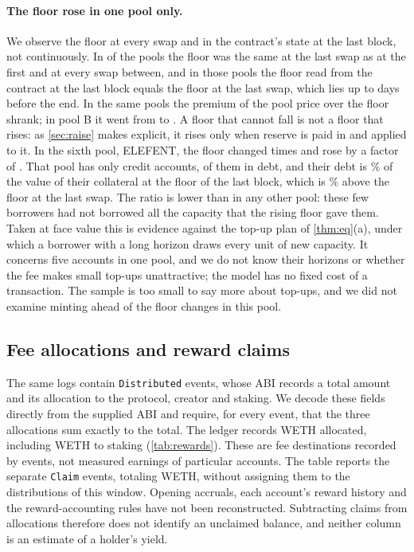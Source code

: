 \paragraph{The floor rose in one pool only.} We observe the floor at every swap and in the contract's state at the last block, not continuously. In \EFlatPools{} of the \EPools{} pools the floor was the same at the last swap as at the first and at every swap between, and in those pools the floor read from the contract at the last block equals the floor at the last swap, which lies up to \EMaxSwapGap{} days before the end. In the same pools the premium of the pool price over the floor shrank; in pool B it went from \EBPremFirst{} to \EBPremLast. A floor that cannot fall is not a floor that rises: as \cref{sec:raise} makes explicit, it rises only when reserve is paid in and applied to it. In the sixth pool, ELEFENT, the floor changed \EElChanges{} times and rose by a factor of \EElRatio. That pool has only \EElAccounts{} credit accounts, \EElOpen{} of them in debt, and their debt is \EElLtv\% of the value of their collateral at the floor of the last block, which is \EElFloorEndPct\% above the floor at the last swap. The ratio is lower than in any other pool: these few borrowers had not borrowed all the capacity that the rising floor gave them. Taken at face value this is evidence against the top-up plan of \cref{thm:eq}(a), under which a borrower with a long horizon draws every unit of new capacity. It concerns five accounts in one pool, and we do not know their horizons or whether the fee makes small top-ups unattractive; the model has no fixed cost of a transaction. The sample is too small to say more about top-ups, and we did not examine minting ahead of the floor changes in this pool.

\subsection{Fee allocations and reward claims}\label{sec:rewards}

The same logs contain \RNDistributions{} \texttt{Distributed} events, whose ABI records a total amount and its allocation to the protocol, creator and staking. We decode these fields directly from the supplied ABI and require, for every event, that the three allocations sum exactly to the total. The ledger records \RTotal{} WETH allocated, including \RStaking{} WETH to staking (\cref{tab:rewards}). These are fee destinations recorded by events, not measured earnings of particular accounts. The table reports the separate \RNClaims{} \texttt{Claim} events, totaling \RClaimed{} WETH, without assigning them to the distributions of this window. Opening accruals, each account's reward history and the reward-accounting rules have not been reconstructed. Subtracting claims from allocations therefore does not identify an unclaimed balance, and neither column is an estimate of a holder's yield.

